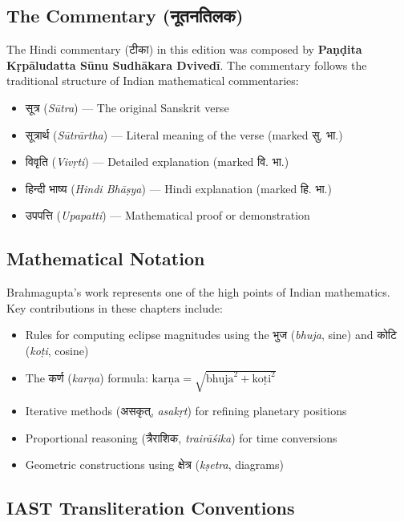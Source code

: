 \documentclass[11pt,a4paper]{article}
\newcommand{\dev}[1]{{\devanagarifont #1}}
\begin{document}
\subsection*{The Commentary ({\devanagarifont नूतनतिलक})}

The Hindi commentary ({\devanagarifont टीका}) in this edition was composed by \textbf{Paṇḍita Kṛpāludatta Sūnu Sudhākara Dvivedī}. The commentary follows the traditional structure of Indian mathematical commentaries:

\begin{itemize}
\item {\devanagarifont सूत्र} (\textit{Sūtra}) --- The original Sanskrit verse
\item {\devanagarifont सूत्रार्थ} (\textit{Sūtrārtha}) --- Literal meaning of the verse (marked {\devanagarifont सु. भा.})
\item \dev{विवृति} (\textit{Vivṛti}) --- Detailed explanation (marked \dev{वि. भा.})
\item \dev{हिन्दी भाष्य} (\textit{Hindi Bhāṣya}) --- Hindi explanation (marked \dev{हि. भा.})
\item \dev{उपपत्ति} (\textit{Upapatti}) --- Mathematical proof or demonstration
\end{itemize}

\subsection*{Mathematical Notation}

Brahmagupta's work represents one of the high points of Indian mathematics. Key contributions in these chapters include:

\begin{itemize}
\item Rules for computing eclipse magnitudes using the \dev{भुज} (\textit{bhuja}, sine) and \dev{कोटि} (\textit{koṭi}, cosine)
\item The \dev{कर्ण} (\textit{karṇa}) formula: $\text{karṇa} = \sqrt{\text{bhuja}^2 + \text{koṭi}^2}$
\item Iterative methods (\dev{असकृत्}, \textit{asakṛt}) for refining planetary positions
\item Proportional reasoning (\dev{त्रैराशिक}, \textit{trairāśika}) for time conversions
\item Geometric constructions using \dev{क्षेत्र} (\textit{kṣetra}, diagrams)
\end{itemize}

\subsection*{IAST Transliteration Conventions}
\end{document}
